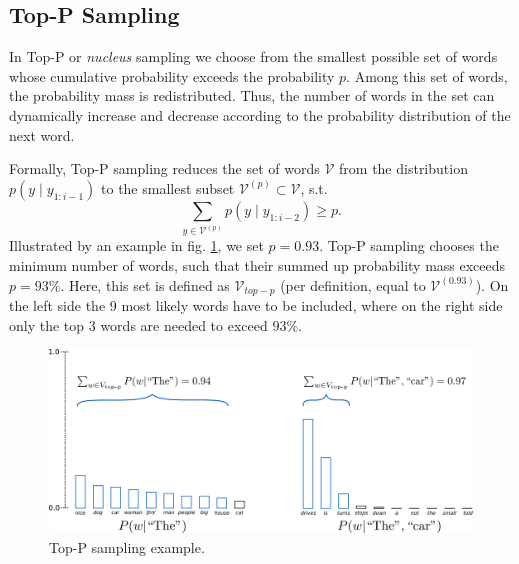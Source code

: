 \subsection{Top-P Sampling}
In Top-P or \textit{nucleus} sampling \cite{holtzman2019curious} we choose from the smallest possible set of words whose cumulative probability exceeds the probability $p$. Among this set of words, the probability mass is redistributed. Thus, the number of words in the set can dynamically increase and decrease according to the probability distribution of the next word.

Formally, Top-P sampling reduces the set of words $\mathcal{V}$ from the distribution $p(y\mid y_{1:i-1})$ to the smallest subset $\mathcal{V}^{(p)}\subset \mathcal{V}$, s.t.
\begin{equation}
    \sum_{y\in \mathcal{V}^{(p)}}{p(y\mid y_{1:i-2})}\geq p.
\end{equation}
Illustrated by an example in fig. \ref{fig:topp}, we set $p=0.93$. Top-P sampling chooses the minimum number of words, such that their summed up probability mass exceeds $p=93\%$. Here, this set is defined as $\mathcal{V}_{top-p}$ (per definition, equal to $\mathcal{V}^{(0.93)}$). On the left side the 9 most likely words have to be included, where on the right side only the top 3 words are needed to exceed $93\%$. \cite{trafogen}
\begin{figure}[H]
    \centering
    \includegraphics[width=1.0\textwidth]{figures/topp}
    \caption{Top-P sampling example. \cite{trafogen}}
    \label{fig:topp}
\end{figure}

